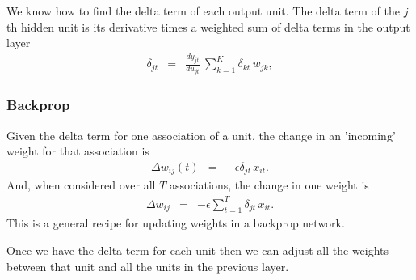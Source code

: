 \documentclass{beamer}
\newcommand{\bea}       { \begin{eqnarray}  }
\newcommand{\eea}       { \end{eqnarray}    }
\newcommand{\ipstate}{{x}}
\newcommand{\hop}{z}
\newcommand{\hstate}{\hop}
\renewcommand{\hop}{{y}}
\newcommand{\Lrate}{\epsilon}
\begin{document}
\begin{frame}
\begin{figure}[b!]
\begin{center}
\begin{tikzpicture}[shorten >=1pt,->,draw=black!100, node distance=\layersep, thick]
\end{tikzpicture}
\label{XORsolutionB}
\end{center}
\end{figure}
We know how to find the delta term of each output unit.  
The delta term of the $j$th hidden unit is its derivative times a weighted sum of delta terms in the output layer
\bea
	    \delta_{jt} & = &    \frac{dy_{jt} }{ du_{jt} } \: \sum_{k=1}^{K}  \delta_{kt}\, w_{jk}, \label{eqhiddendelta}
\eea
\end{frame}

\begin{frame}
   \frametitle{Backprop}
Given the delta term for one association of a unit, the  change in an 'incoming' weight for that association  is 
   \bea
		\Delta w_{ij}(t)   & = & - \Lrate  \delta_{jt} \, \ipstate_{it}. 
\eea
And,   when considered over all $T$ associations, the change in one weight is
\bea
		\Delta w_{ij}   & = & - \Lrate\sum_{t=1}^{T} \delta_{jt} \, \ipstate_{it}. 
\eea
This is a general recipe for updating weights in a backprop network. 
 
Once we have the delta term for each unit then we can adjust all the weights between that unit and all the units in the previous layer. 

\end{frame}
\end{document}
